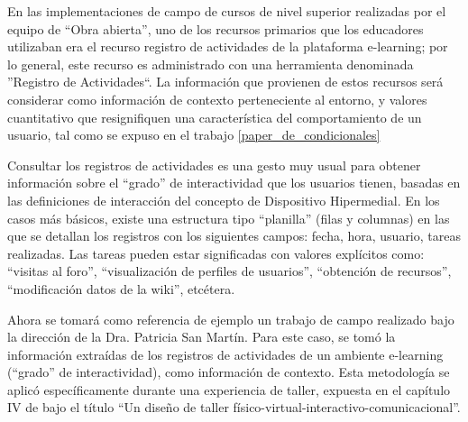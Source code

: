 \begin{itemize}
En las implementaciones de campo de cursos de nivel superior realizadas por
el equipo de “Obra abierta”, uno de los recursos primarios que los educadores
utilizaban era el recurso registro de actividades de la plataforma e-learning; por lo general, este recurso es administrado con una herramienta denominada ''Registro de Actividades``.  La información que provienen de estos recursos será considerar como información de contexto perteneciente al entorno, y valores cuantitativo que resignifiquen una característica del comportamiento de un usuario, tal como se expuso en el trabajo \ref{paper_de_condicionales} 


Consultar los registros de actividades es una gesto muy usual para obtener
información sobre el “grado” de interactividad que los usuarios \cite{arqDHD3} tienen, basadas en las definiciones de interacción del concepto de Dispositivo Hipermedial. En los casos más básicos, existe una estructura tipo “planilla” (filas y columnas) en las que se detallan los registros con los siguientes campos: fecha, hora, usuario, tareas realizadas. Las tareas pueden estar significadas con valores explícitos como: “visitas al foro”, “visualización de perfiles de usuarios”, “obtención de recursos”, “modificación datos de la wiki”, etcétera.

Ahora se tomará como referencia de ejemplo un trabajo de campo realizado bajo la dirección de la Dra. Patricia San Martín. Para este caso, se tomó la información extraídas de los registros de actividades de un ambiente e-learning (“grado” de interactividad), como información de contexto. Esta metodología se aplicó específicamente durante una experiencia de taller, expuesta en el capítulo IV de \cite{DHD} bajo el título “Un diseño de taller físico-virtual-interactivo-comunicacional”.


\end{itemize}
